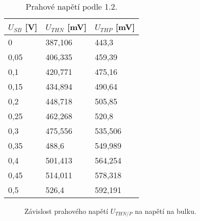 \begin{table}[]
    \def\arraystretch{1.2}
    \centering
    \begin{tabular}{|l|l|l|}
    \hline
    \(U_{SB} \) [V]  & \(U_{TH N}\) [mV] & \(U_{TH P}\) [mV] \\ \hline\hline
    0          & 387,106  & 443,3  \\ \hline
0,05           & 406,335  & 459,39  \\ \hline
    0,1        & 420,771  & 475,16  \\ \hline
0,15           & 434,894  & 490,64  \\ \hline
    0,2        & 448,718  & 505,85  \\ \hline
0,25           & 462,268  & 520,8  \\ \hline
    0,3        & 475,556  & 535,506  \\ \hline
0,35           & 488,6    & 549,989  \\ \hline
    0,4        & 501,413  & 564,254  \\ \hline
0,45           & 514,011  & 578,318  \\ \hline
    0,5        & 526,4    & 592,191  \\ \hline
    \end{tabular}
    \caption{Prahové napětí podle 1.2.}
    \label{tab:1-1-2_hodnoty}
\end{table}

\begin{figure*}[h!]
    \caption{Závislost prahového napětí \(U_{TH N/P} \) na napětí na bulku. }
\end{figure*}
